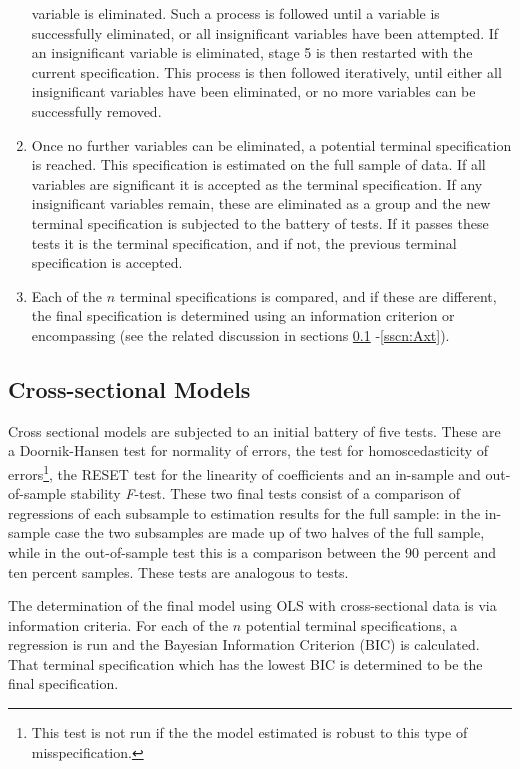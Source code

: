 \documentclass{article}[11pt]
\begin{document}
\begin{spacing}{1.2}
\begin{enumerate}
 variable is eliminated.  Such a process is followed until a variable is successfully eliminated, or all insignificant 
 variables have been attempted.  If an insignificant variable is eliminated, stage 5 is then restarted with the
 current specification.  This process is then followed iteratively, until either all insignificant variables
 have been eliminated, or no more variables can be successfully removed.
 \item Once no further variables can be eliminated, a potential terminal specification is reached.  This 
 specification is estimated on the full sample of data.  If all variables are significant it is accepted as the 
 terminal specification.  If any insignificant variables remain, these are eliminated as a group and the new 
 terminal specification is subjected to the battery of tests.  If it passes these tests it is the terminal 
 specification, and if not, the previous terminal specification is accepted.
 \item Each of the $n$ terminal specifications is compared, and if these are different, the final specification
 is determined using an information criterion or encompassing (see the related discussion in sections \ref{sscn:Acs}
 -\ref{sscn:Axt}).
\end{enumerate}

\subsection{Cross-sectional Models}
\label{sscn:Acs}
Cross sectional models are subjected to an initial battery of five tests.  These are a Doornik-Hansen test for normality
of errors, the \citet{BreuschPagan1979} test for homoscedasticity of errors\footnote{This test is not run if the the model 
estimated is robust to this type of misspecification.}, the RESET test for the linearity of coefficients \citep{Ramsey1969}
and an in-sample and out-of-sample stability \emph{F}-test.  These two final tests consist of a comparison of regressions
of each subsample to estimation results for the full sample: in the in-sample case the two subsamples are made up of two
halves of the full sample, while in the out-of-sample test this is a comparison between the 90 percent and ten percent samples.
These tests are analogous to \citet{Chow1960} tests.

The determination of the final model using OLS with cross-sectional data is via information criteria.  For each of the
$n$ potential terminal specifications, a regression is run and the Bayesian Information Criterion (BIC) is calculated.
That terminal specification which has the lowest BIC is determined to be the final specification.

\end{spacing}
\end{document}
